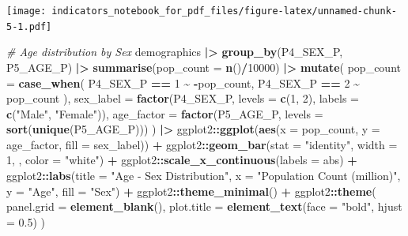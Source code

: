 \documentclass[
]{article}
\newenvironment{Shaded}{\begin{snugshade}}{\end{snugshade}}
\newcommand{\AttributeTok}[1]{\textcolor[rgb]{0.13,0.29,0.53}{#1}}
\newcommand{\CommentTok}[1]{\textcolor[rgb]{0.56,0.35,0.01}{\textit{#1}}}
\newcommand{\DecValTok}[1]{\textcolor[rgb]{0.00,0.00,0.81}{#1}}
\newcommand{\FloatTok}[1]{\textcolor[rgb]{0.00,0.00,0.81}{#1}}
\newcommand{\FunctionTok}[1]{\textcolor[rgb]{0.13,0.29,0.53}{\textbf{#1}}}
\newcommand{\NormalTok}[1]{#1}
\newcommand{\SpecialCharTok}[1]{\textcolor[rgb]{0.81,0.36,0.00}{\textbf{#1}}}
\newcommand{\StringTok}[1]{\textcolor[rgb]{0.31,0.60,0.02}{#1}}
\newenvironment{UNFPAShadedBox}{%
\begin{tcolorbox}[sharp corners, enhanced, colback=white, boxrule=0pt, borderline west={2pt}{0pt}{orange}]%
}{\end{tcolorbox}}
\newenvironment{Highlighting}{\begin{UNFPAShadedBox}}{\end{UNFPAShadedBox}}
\begin{document}
\texttt{[image: indicators\_notebook\_for\_pdf\_files/figure-latex/unnamed-chunk-5-1.pdf]}

\begin{Shaded}
\begin{Highlighting}[]
\CommentTok{\# Age distribution by Sex}
\NormalTok{demographics }\SpecialCharTok{|\textgreater{}}
  \FunctionTok{group\_by}\NormalTok{(P4\_SEX\_P, P5\_AGE\_P) }\SpecialCharTok{|\textgreater{}}
  \FunctionTok{summarise}\NormalTok{(}\AttributeTok{pop\_count =} \FunctionTok{n}\NormalTok{()}\SpecialCharTok{/}\DecValTok{10000}\NormalTok{) }\SpecialCharTok{|\textgreater{}}
  \FunctionTok{mutate}\NormalTok{(}
    \AttributeTok{pop\_count =} \FunctionTok{case\_when}\NormalTok{(}
\NormalTok{      P4\_SEX\_P }\SpecialCharTok{==} \DecValTok{1} \SpecialCharTok{\textasciitilde{}} \SpecialCharTok{{-}}\NormalTok{pop\_count,}
\NormalTok{      P4\_SEX\_P }\SpecialCharTok{==} \DecValTok{2} \SpecialCharTok{\textasciitilde{}}\NormalTok{ pop\_count}
\NormalTok{    ),}
    \AttributeTok{sex\_label =} \FunctionTok{factor}\NormalTok{(P4\_SEX\_P, }\AttributeTok{levels =} \FunctionTok{c}\NormalTok{(}\DecValTok{1}\NormalTok{, }\DecValTok{2}\NormalTok{), }\AttributeTok{labels =} \FunctionTok{c}\NormalTok{(}\StringTok{"Male"}\NormalTok{, }\StringTok{"Female"}\NormalTok{)),}
    \AttributeTok{age\_factor =} \FunctionTok{factor}\NormalTok{(P5\_AGE\_P, }\AttributeTok{levels =} \FunctionTok{sort}\NormalTok{(}\FunctionTok{unique}\NormalTok{(P5\_AGE\_P)))}
\NormalTok{  ) }\SpecialCharTok{|\textgreater{}}
\NormalTok{  ggplot2}\SpecialCharTok{::}\FunctionTok{ggplot}\NormalTok{(}\FunctionTok{aes}\NormalTok{(}\AttributeTok{x =}\NormalTok{ pop\_count, }\AttributeTok{y =}\NormalTok{ age\_factor, }\AttributeTok{fill =}\NormalTok{ sex\_label)) }\SpecialCharTok{+}
\NormalTok{  ggplot2}\SpecialCharTok{::}\FunctionTok{geom\_bar}\NormalTok{(}\AttributeTok{stat =} \StringTok{"identity"}\NormalTok{, }\AttributeTok{width =} \DecValTok{1}\NormalTok{, , }\AttributeTok{color =} \StringTok{"white"}\NormalTok{) }\SpecialCharTok{+}
\NormalTok{  ggplot2}\SpecialCharTok{::}\FunctionTok{scale\_x\_continuous}\NormalTok{(}\AttributeTok{labels =}\NormalTok{ abs) }\SpecialCharTok{+}
\NormalTok{  ggplot2}\SpecialCharTok{::}\FunctionTok{labs}\NormalTok{(}\AttributeTok{title =} \StringTok{"Age {-} Sex Distribution"}\NormalTok{,}
                \AttributeTok{x =} \StringTok{"Population Count (million)"}\NormalTok{, }
                \AttributeTok{y =} \StringTok{"Age"}\NormalTok{, }
                \AttributeTok{fill =} \StringTok{"Sex"}\NormalTok{) }\SpecialCharTok{+}
\NormalTok{  ggplot2}\SpecialCharTok{::}\FunctionTok{theme\_minimal}\NormalTok{() }\SpecialCharTok{+}
\NormalTok{  ggplot2}\SpecialCharTok{::}\FunctionTok{theme}\NormalTok{(}
    \AttributeTok{panel.grid =} \FunctionTok{element\_blank}\NormalTok{(),}
    \AttributeTok{plot.title =} \FunctionTok{element\_text}\NormalTok{(}\AttributeTok{face =} \StringTok{"bold"}\NormalTok{, }\AttributeTok{hjust =} \FloatTok{0.5}\NormalTok{)}
\NormalTok{  )}
\end{Highlighting}
\end{Shaded}
\end{document}
